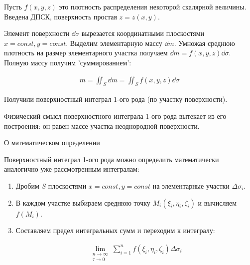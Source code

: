 
\begin{twocolumns}
  
  \columnbreak

  Пусть \(f(x, y, z)\) это плотность распределения некоторой скалярной величины.
  Введена ДПСК, поверхность простая \(z = z(x, y)\).

  Элемент поверхности \(\dd \sigma\) вырезается координатными плоскостями
  \(x = const, y = const\). Выделим элементарную массу \(\dd  m\). Умножая
  среднюю плотность на размер элементарного участка получаем
  \(\dd m = f(x, y, z) \dd \sigma\). Полную массу получим 'суммированием':

  \begin{align*}
    m = \iint_{S} \dd m = \iint_{S} f(x, y, z) \dd \sigma
  \end{align*}

  Получили поверхностный интеграл 1-ого рода (по участку поверхности).
\end{twocolumns}

\begin{remark}
  Физический смысл поверхностного интеграла 1-ого рода вытекает из его
  построения: он равен массе участка неоднородной поверхности.
\end{remark}

\begin{remark}
  О математическом определении

  Поверхностный интеграл 1-ого рода можно определить математически аналогично
  уже рассмотренным интегралам:

  \begin{enumerate}
    \item Дробим \(S\) плоскостями \(x = const, y = const\) на элементарные
    участки \(\Delta \sigma_{i}\).

    \item В каждом участке выбираем среднюю точку
    \(M_{i}(\xi_{i}, \eta_{i}, \zeta_{i})\) и вычисляем \(f(M_{i})\).

    \item Составляем предел интегральных сумм и переходим к интегралу:

    \begin{align*}
      \lim_{\substack{n \to \infty \\ \tau \to 0}}
        \sum_{i = 1}^{n} f(\xi_{i}, \eta_{i}, \zeta_{i}) \Delta \sigma_{i}
    \end{align*}
  \end{enumerate}
\end{remark}

